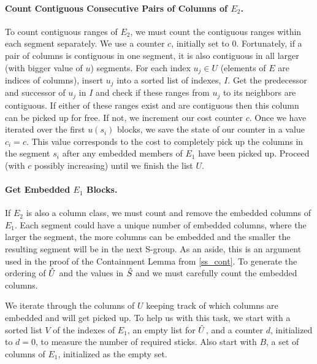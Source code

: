 \paragraph{Count Contiguous Consecutive Pairs of Columns of $E_2$.}
To count contiguous ranges of $E_2$, we must count the contiguous ranges within each segment separately.  We use a counter $c$, initially set to $0$.
Fortunately, if a pair of columns is contiguous in one segment, it is also contiguous in all larger (with bigger value of $u$) segments.
For each index $u_j \in U$ (elements of $E$ are indices of columns),
 insert $u_j$ into a sorted list of indexes, $I$.
Get the predecessor and successor of $u_j$ in $I$ and check if these ranges from $u_j$ to its neighbors are contiguous.
If either of these ranges exist and are contiguous
 then this column can be picked up for free.
If not, we increment our cost counter $c$.
Once we have iterated over the first $u(s_i)$ blocks, we save the state of our counter in a value $c_i = c$.
This value corresponds to the cost to completely pick up the columns in the segment $s_i$ after any embedded members of $E_1$ have been picked up.
Proceed (with $c$ possibly increasing) until we finish the list $U$.


\paragraph{Get Embedded $E_1$ Blocks.}
If $E_2$ is also a column class, we must count and remove the embedded columns of $E_1$.
Each segment could have a unique number of embedded columns, where the larger the segment, the more columns can be embedded and the smaller the resulting segment will be in the next S-group.
As an aside, this is an argument used in the proof of the Containment Lemma
from \ref{ss_cont}.
To generate the ordering of $\hat{U}$ and the values in $\hat{S}$ and
we must carefully count the embedded columns.

We iterate through the columns of $U$ keeping track of which columns
 are embedded and will get picked up.
To help us with this task, we start with a sorted list $V$
of the indexes of $E_1$, an empty list for $\hat{U}$,
 and a counter $d$, initialized to $d=0$,
 to measure the number of required sticks.
Also start with $B$, a set of columns of $E_1$, initialized as the empty set.

